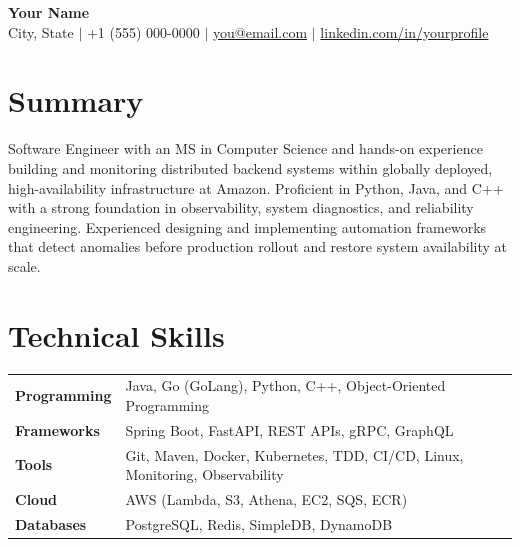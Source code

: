 \documentclass[a4paper,10.5pt]{article} %
\begin{document}
\pagestyle{empty}

\begin{center}
{\huge \textbf{Your Name}} \\[3pt]
City, State $|$ +1 (555) 000-0000 $|$ \href{mailto:you@email.com}{you@email.com} $|$ \href{https://www.linkedin.com/in/yourprofile/}{linkedin.com/in/yourprofile}
\end{center}

\section*{Summary}
Software Engineer with an MS in Computer Science and hands-on experience 
building and monitoring distributed backend systems within globally deployed, 
high-availability infrastructure at Amazon. Proficient in Python, Java, and 
C++ with a strong foundation in observability, system diagnostics, and 
reliability engineering. Experienced designing and implementing automation 
frameworks that detect anomalies before production rollout and restore 
system availability at scale.

\section*{Technical Skills}
\begin{tabularx}{\linewidth}{@{}l X@{}}
\textbf{Programming}      & Java, Go (GoLang), Python, C++, Object-Oriented Programming\\[2pt]
\textbf{Frameworks} & Spring Boot, FastAPI, REST APIs, gRPC, GraphQL\\[2pt]
\textbf{Tools} & Git, Maven, Docker, Kubernetes, TDD, CI/CD, Linux, Monitoring, Observability\\[2pt]
\textbf{Cloud}            & AWS (Lambda, S3, Athena, EC2, SQS, ECR)\\[2pt]
\textbf{Databases}        & PostgreSQL, Redis, SimpleDB, DynamoDB\\[2pt]
\end{tabularx}
\end{document}
